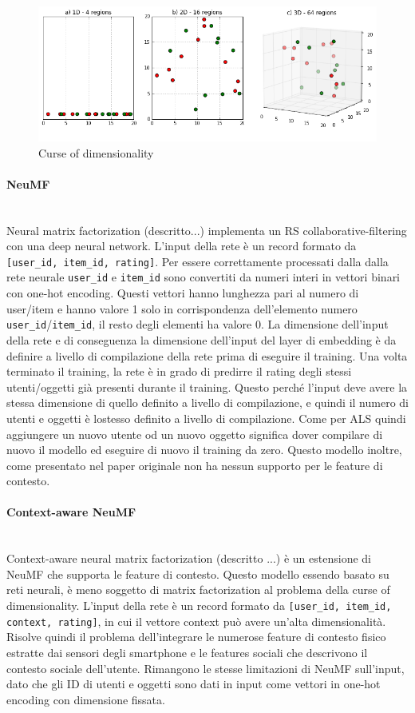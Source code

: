 \documentclass[12pt,italian]{report}
\newcommand{\myparagraph}[1]{\paragraph{#1}\mbox{}\\}
\begin{document}
\begin{figure}
  \includegraphics[width=\linewidth]{immagini/curse_of_dimensionality.png}
  \caption{Curse of dimensionality}
  \label{fig:curse-dim}
\end{figure}

\myparagraph{NeuMF}
Neural matrix factorization (descritto...) implementa un RS
collaborative-filtering con una deep neural network. L'input della 
rete è un record formato da \texttt{[user\_id, item\_id, rating]}.
Per essere correttamente processati dalla dalla rete neurale \texttt{user\_id} e \texttt{item\_id} sono convertiti da numeri interi in vettori binari con one-hot encoding. Questi vettori hanno lunghezza pari al numero di 
user/item e hanno valore 1 solo in corrispondenza dell'elemento numero 
\texttt{user\_id}/\texttt{item\_id}, il resto degli elementi ha valore 0. La dimensione dell'input della rete e di conseguenza la dimensione dell'input del layer di embedding è da definire a livello di compilazione della rete prima di eseguire il training. Una volta terminato il training, la rete è in grado di predirre il rating degli stessi utenti/oggetti già presenti durante il training. Questo perché l'input deve avere la stessa dimensione di quello definito a livello di compilazione, e quindi il numero di utenti e oggetti è lostesso definito a livello di compilazione. Come per ALS quindi aggiungere un nuovo utente od un nuovo oggetto significa dover compilare di nuovo il modello ed eseguire di nuovo il training da zero. Questo modello inoltre, come presentato nel paper originale \cite{NCF} non ha nessun supporto per le feature di contesto.

\myparagraph{Context-aware NeuMF}
Context-aware neural matrix factorization (descritto ...) è un estensione di NeuMF che supporta le feature di contesto. Questo modello essendo basato su reti neurali, è meno soggetto di matrix factorization al problema della curse of dimensionality. L'input della rete è un record formato da \texttt{[user\_id, item\_id, context, rating]}, in cui il vettore context può avere un'alta dimensionalità. Risolve quindi il problema dell'integrare le numerose feature di contesto fisico estratte dai sensori degli smartphone e le features sociali che descrivono il contesto sociale dell'utente. Rimangono le stesse limitazioni di NeuMF sull'input, dato che gli ID di utenti e oggetti sono dati in input come vettori in one-hot encoding con dimensione fissata.
\end{document}
